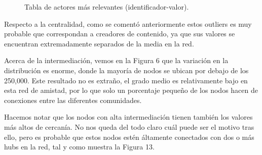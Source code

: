 \begin{figure}[H]
    \centering
    \caption{Tabla de actores más relevantes (identificador-valor).}
\end{figure}

Respecto a la centralidad, como se comentó anteriormente estos outliers es muy probable que correspondan a creadores de contenido, ya que sus valores se encuentran extremadamente separados de la media en la red.

Acerca de la intermediación, vemos en la Figura 6 que la variación en la distribución es enorme, donde la mayoría de nodos se ubican por debajo de los 250,000. Este resultado no es extraño, el grado medio es relativamente bajo en esta red de amistad, por lo que solo un porcentaje pequeño de los nodos hacen de conexiones entre las diferentes comunidades.

\vspace{\baselineskip}

Hacemos notar que los nodos con alta intermediación tienen también los valores más altos de cercanía. No nos queda del todo claro cuál puede ser el motivo tras ello, pero es probable que estos nodos estén áltamente conectados con dos o más hubs en la red, tal y como muestra la  Figura 13.

\vspace{\baselineskip}

